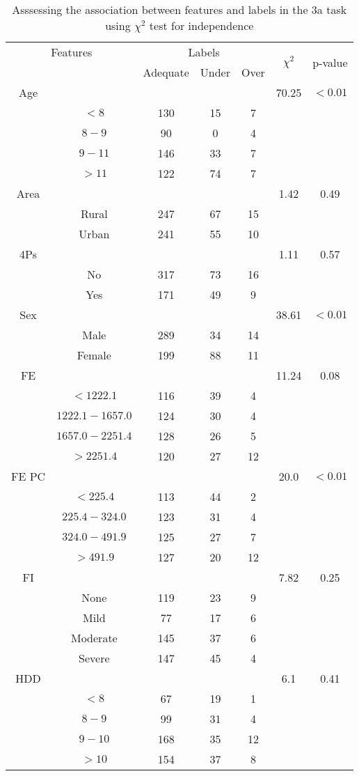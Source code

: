 \begin{table}[!htb]
\centering
\caption{Asssessing the association between features and labels in the 3a task using $\chi^2$ test for independence}
\label{tab:chitest_3a}
\begin{tabular}{c c | c c c| c | c}
\hline
\multicolumn{2}{c|}{Features}& \multicolumn{3}{c|}{Labels}& \multirow{2}{*}{$\chi^2$} & \multirow{2}{*}{p-value}\\ 
& & Adequate & Under & Over & & \\ 
\hline
Age &  &  &  & & 70.25 & $< 0.01$ \\ 
& $< 8$ & 130 & 15 & 7& & \\ 
& $8-9$ & 90 & 0 & 4& & \\ 
& $9-11$ & 146 & 33 & 7& & \\ 
& $> 11$ & 122 & 74 & 7& & \\ 
\hline 
Area &  &  &  & & 1.42 & 0.49 \\ 
& Rural & 247 & 67 & 15& & \\ 
& Urban & 241 & 55 & 10& & \\ 
\hline 
4Ps &  &  &  & & 1.11 & 0.57 \\ 
& No & 317 & 73 & 16& & \\ 
& Yes & 171 & 49 & 9& & \\ 
\hline 
Sex &  &  &  & & 38.61 & $< 0.01$ \\ 
& Male & 289 & 34 & 14& & \\ 
& Female & 199 & 88 & 11& & \\ 
\hline 
FE &  &  &  & & 11.24 & 0.08 \\ 
& $< 1222.1$ & 116 & 39 & 4& & \\ 
& $1222.1-1657.0$ & 124 & 30 & 4& & \\ 
& $1657.0-2251.4$ & 128 & 26 & 5& & \\ 
& $> 2251.4$ & 120 & 27 & 12& & \\ 
\hline 
FE PC &  &  &  & & 20.0 & $< 0.01$ \\ 
& $< 225.4$ & 113 & 44 & 2& & \\ 
& $225.4-324.0$ & 123 & 31 & 4& & \\ 
& $324.0-491.9$ & 125 & 27 & 7& & \\ 
& $> 491.9$ & 127 & 20 & 12& & \\ 
\hline 
FI &  &  &  & & 7.82 & 0.25 \\ 
& None & 119 & 23 & 9& & \\ 
& Mild & 77 & 17 & 6& & \\ 
& Moderate & 145 & 37 & 6& & \\ 
& Severe & 147 & 45 & 4& & \\ 
\hline 
HDD &  &  &  & & 6.1 & 0.41 \\ 
& $< 8$ & 67 & 19 & 1& & \\ 
& $8-9$ & 99 & 31 & 4& & \\ 
& $9-10$ & 168 & 35 & 12& & \\ 
& $> 10$ & 154 & 37 & 8& & \\ 
\hline 
\end{tabular}
\end{table}
